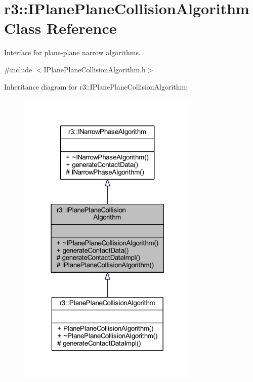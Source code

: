 \hypertarget{classr3_1_1_i_plane_plane_collision_algorithm}{}\section{r3\+:\+:I\+Plane\+Plane\+Collision\+Algorithm Class Reference}
\label{classr3_1_1_i_plane_plane_collision_algorithm}


Interface for plane-\/plane narrow algorithms.  




{\ttfamily \#include $<$I\+Plane\+Plane\+Collision\+Algorithm.\+h$>$}



Inheritance diagram for r3\+:\+:I\+Plane\+Plane\+Collision\+Algorithm\+:\nopagebreak
\begin{figure}[H]
\begin{center}
\leavevmode
\includegraphics[width=247pt]{classr3_1_1_i_plane_plane_collision_algorithm__inherit__graph}
\end{center}
\end{figure}


